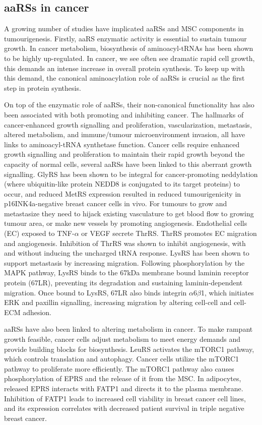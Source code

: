 \subsection{aaRSs in cancer}
A growing number of studies have implicated aaRSs and MSC components in tumourigenesis.
Firstly, aaRS enzymatic activity is essential to sustain tumour growth. In cancer metabolism, biosynthesis of aminoacyl-tRNAs has been shown to be highly up-regulated\cite{hu2013heterogeneity}.
In cancer, we see often see dramatic rapid cell growth, this demands an intense increase in overall protein synthesis. To keep up with this demand, the canonical aminoacylation role of aaRSs is crucial as the first step in protein synthesis.

On top of the enzymatic role of aaRSs, their non-canonical functionality has also been associated with both promoting and inhibiting cancer.
The hallmarks of cancer-enhanced growth signalling and proliferation, vascularization, metastasis, altered metabolism, and immune/tumour microenvironment invasion, all have links to aminoacyl-tRNA synthetase function.
Cancer cells require enhanced growth signalling and proliferation to maintain their rapid growth beyond the capacity of normal cells, several aaRSs have been linked to this aberrant growth signalling.
GlyRS has been shown to be integral for cancer-promoting neddylation (where ubiquitin-like protein NEDD8 is conjugated to its target proteins) to occur, and reduced MetRS expression resulted in reduced tumourigenicity in p16INK4a-negative breast cancer cells in vivo\cite{mo2016neddylation, deng2020role, kwon2018stabilization}.
For tumours to grow and metastasize they need to hijack existing vasculature to get blood flow to growing tumour area, or make new vessels by promoting angiogenesis.
Endothelial cells (EC) exposed to TNF-$\alpha$ or VEGF secrete ThrRS.
ThrRS promotes EC migration and angiogenesis.
Inhibition of ThrRS was shown to inhibit angiogenesis, with and without inducing the uncharged tRNA response\cite{williams2013secreted, mirando2015aminoacyl}.
LysRS has been shown to support metastasis by increasing migration.
Following phosphorylation by the MAPK pathway, LysRS binds to the 67kDa membrane bound laminin receptor protein (67LR), preventing its degradation and sustaining laminin-dependent migration.
Once bound to LysRS, 67LR also binds integrin $\alpha$6$\beta$1, which initiates ERK and paxillin signalling, increasing migration by altering cell-cell and cell-ECM adhesion.

aaRSs have also been linked to altering metabolism in cancer.
To make rampant growth feasible, cancer cells adjust metabolism to meet energy demands and provide building blocks for biosynthesis.
LeuRS activates the mTORC1 pathway, which controls translation and autophagy.
Cancer cells utilize the mTORC1 pathway to proliferate more efficiently.
The mTORC1 pathway also causes phosphorylation of EPRS and the release of it from the MSC.
In adipocytes, released EPRS interacts with FATP1 and directs it to the plasma membrane.
Inhibition of FATP1 leads to increased cell viability in breast cancer cell lines, and its expression correlates with decreased patient survival in triple negative breast cancer\cite{mendes2019unraveling}.

